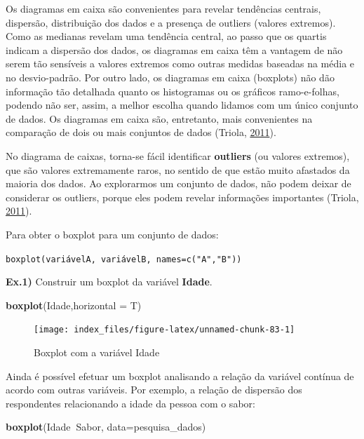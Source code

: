 \documentclass[12pt,brazil,oneside]{book}
\newenvironment{Shaded}{\begin{snugshade}}{\end{snugshade}}
\newcommand{\DataTypeTok}[1]{\textcolor[rgb]{0.13,0.29,0.53}{#1}}
\newcommand{\KeywordTok}[1]{\textcolor[rgb]{0.13,0.29,0.53}{\textbf{#1}}}
\newcommand{\NormalTok}[1]{#1}
\newcommand{\OperatorTok}[1]{\textcolor[rgb]{0.81,0.36,0.00}{\textbf{#1}}}
\begin{document}
Os diagramas em caixa são convenientes para revelar tendências centrais, dispersão, distribuição dos dados e a presença de outliers (valores extremos). Como as medianas revelam uma tendência central, ao passo que os quartis indicam a dispersão dos dados, os diagramas em caixa têm a vantagem de não serem tão sensíveis a valores extremos como outras medidas baseadas na média e no desvio-padrão. Por outro lado, os diagramas em caixa (boxplots) não dão informação tão detalhada quanto os histogramas ou os gráficos ramo-e-folhas, podendo não ser, assim, a melhor escolha quando lidamos com um único conjunto de dados. Os diagramas em caixa são, entretanto, mais convenientes na comparação de dois ou mais conjuntos de dados (Triola, \protect\hyperlink{ref-triola1999}{2011}).

No diagrama de caixas, torna-se fácil identificar \textbf{outliers} (ou valores extremos), que são valores extremamente raros, no sentido de que estão muito afastados da maioria dos dados. Ao explorarmos um conjunto de dados, não podem deixar de considerar os outliers, porque eles podem revelar informações importantes (Triola, \protect\hyperlink{ref-triola1999}{2011}).

Para obter o boxplot para um conjunto de dados:

\texttt{boxplot(variávelA,\ variávelB,\ names=c("A","B"))}

\textbf{Ex.1)} Construir um boxplot da variável \textbf{Idade}.

\begin{Shaded}
\begin{Highlighting}[]
\KeywordTok{boxplot}\NormalTok{(Idade,}\DataTypeTok{horizontal =}\NormalTok{ T)}
\end{Highlighting}
\end{Shaded}

\begin{figure}[H]

{\centering \texttt{[image: index\_files/figure-latex/unnamed-chunk-83-1]} 

}

\caption{Boxplot com a variável Idade}\label{fig:unnamed-chunk-83}
\end{figure}

Ainda é possível efetuar um boxplot analisando a relação da variável contínua de acordo com outras variáveis. Por exemplo, a relação de dispersão dos respondentes relacionando a idade da pessoa com o sabor:

\begin{Shaded}
\begin{Highlighting}[]
\KeywordTok{boxplot}\NormalTok{(Idade}\OperatorTok{~}\NormalTok{Sabor, }\DataTypeTok{data=}\NormalTok{pesquisa_dados)}
\end{Highlighting}
\end{Shaded}
\end{document}
